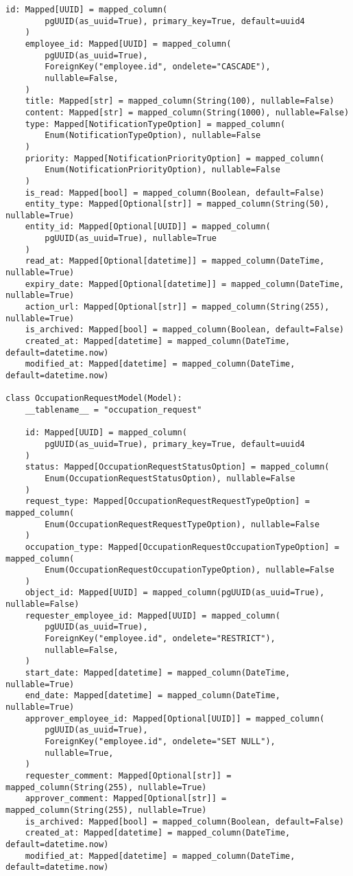 \begin{lstlisting}[style=pythonstyle]
    id: Mapped[UUID] = mapped_column(
        pgUUID(as_uuid=True), primary_key=True, default=uuid4
    )
    employee_id: Mapped[UUID] = mapped_column(
        pgUUID(as_uuid=True),
        ForeignKey("employee.id", ondelete="CASCADE"),
        nullable=False,
    )
    title: Mapped[str] = mapped_column(String(100), nullable=False)
    content: Mapped[str] = mapped_column(String(1000), nullable=False)
    type: Mapped[NotificationTypeOption] = mapped_column(
        Enum(NotificationTypeOption), nullable=False
    )
    priority: Mapped[NotificationPriorityOption] = mapped_column(
        Enum(NotificationPriorityOption), nullable=False
    )
    is_read: Mapped[bool] = mapped_column(Boolean, default=False)
    entity_type: Mapped[Optional[str]] = mapped_column(String(50), nullable=True)
    entity_id: Mapped[Optional[UUID]] = mapped_column(
        pgUUID(as_uuid=True), nullable=True
    )
    read_at: Mapped[Optional[datetime]] = mapped_column(DateTime, nullable=True)
    expiry_date: Mapped[Optional[datetime]] = mapped_column(DateTime, nullable=True)
    action_url: Mapped[Optional[str]] = mapped_column(String(255), nullable=True)
    is_archived: Mapped[bool] = mapped_column(Boolean, default=False)
    created_at: Mapped[datetime] = mapped_column(DateTime, default=datetime.now)
    modified_at: Mapped[datetime] = mapped_column(DateTime, default=datetime.now)

class OccupationRequestModel(Model):
    __tablename__ = "occupation_request"

    id: Mapped[UUID] = mapped_column(
        pgUUID(as_uuid=True), primary_key=True, default=uuid4
    )
    status: Mapped[OccupationRequestStatusOption] = mapped_column(
        Enum(OccupationRequestStatusOption), nullable=False
    )
    request_type: Mapped[OccupationRequestRequestTypeOption] = mapped_column(
        Enum(OccupationRequestRequestTypeOption), nullable=False
    )
    occupation_type: Mapped[OccupationRequestOccupationTypeOption] = mapped_column(
        Enum(OccupationRequestOccupationTypeOption), nullable=False
    )
    object_id: Mapped[UUID] = mapped_column(pgUUID(as_uuid=True), nullable=False)
    requester_employee_id: Mapped[UUID] = mapped_column(
        pgUUID(as_uuid=True),
        ForeignKey("employee.id", ondelete="RESTRICT"),
        nullable=False,
    )
    start_date: Mapped[datetime] = mapped_column(DateTime, nullable=True)
    end_date: Mapped[datetime] = mapped_column(DateTime, nullable=True)
    approver_employee_id: Mapped[Optional[UUID]] = mapped_column(
        pgUUID(as_uuid=True),
        ForeignKey("employee.id", ondelete="SET NULL"),
        nullable=True,
    )
    requester_comment: Mapped[Optional[str]] = mapped_column(String(255), nullable=True)
    approver_comment: Mapped[Optional[str]] = mapped_column(String(255), nullable=True)
    is_archived: Mapped[bool] = mapped_column(Boolean, default=False)
    created_at: Mapped[datetime] = mapped_column(DateTime, default=datetime.now)
    modified_at: Mapped[datetime] = mapped_column(DateTime, default=datetime.now)


\end{lstlisting}
